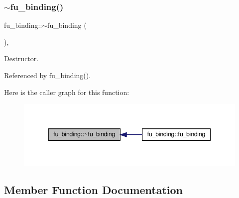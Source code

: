 \subsubsection{\texorpdfstring{$\sim$fu\+\_\+binding()}{~fu\_binding()}}
{\footnotesize\ttfamily fu\+\_\+binding\+::$\sim$fu\+\_\+binding (\begin{DoxyParamCaption}{ }\end{DoxyParamCaption})\hspace{0.3cm}{\ttfamily [virtual]}, {\ttfamily [default]}}



Destructor. 



Referenced by fu\+\_\+binding().

Here is the caller graph for this function\+:
\nopagebreak
\begin{figure}[H]
\begin{center}
\leavevmode
\includegraphics[width=344pt]{d8/d04/classfu__binding_a95e352799ea02609e978752ade999c22_icgraph}
\end{center}
\end{figure}


\subsection{Member Function Documentation}
\mbox{\label{classfu__binding_ab50cb0e1f4ae096856d058f4665636e2}} 
